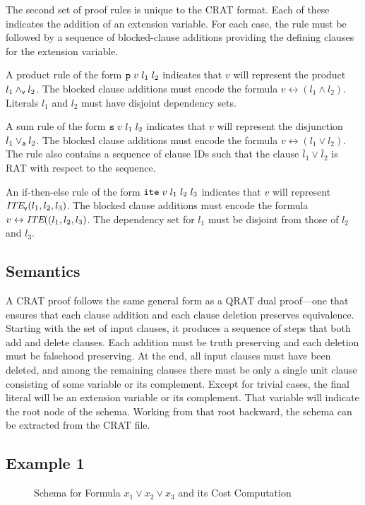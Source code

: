 \documentclass{llncs}
\newcommand{\pand}{\mathbin{\land_{\sf v}}}
\newcommand{\por}{\mathbin{\lor_{\sf a}}}
\newcommand{\obar}[1]{\overline{#1}}
\newcommand{\ite}{\mbox{\it ITE}}
\newcommand{\pite}{\mbox{\it ITE}_{\sf v}}
\begin{document}
The second set of proof rules is unique to the CRAT format.  Each of
these indicates the addition of an extension variable.  For each case,
the rule must be followed by a sequence of blocked-clause additions
providing the defining clauses for the extension variable.

A product rule of the form ${\tt p}\;v\;l_1\;l_2$ indicates that $v$
will represent the product $l_1 \pand l_2$.  The blocked clause
additions must encode the formula $v \leftrightarrow (l_1 \land l_2)$.
Literals $l_1$ and $l_2$ must have disjoint dependency sets.

A sum rule of the form ${\tt s}\;v\;l_1\;l_2$ indicates that $v$ will
represent the disjunction $l_1 \por l_2$.  The blocked clause
additions must encode the formula $v \leftrightarrow (l_1 \lor l_2)$.
The rule also contains a sequence of clause IDs such that the clause
$\obar{l}_1 \lor \obar{l}_2$ is RAT with respect to the sequence.

An if-then-else rule of the form ${\tt ite}\;v\;l_1\;l_2\;l_3$
indicates that $v$ will represent $\pite(l_1, l_2, l_3)$.  The blocked
clause additions must encode the formula
$v \leftrightarrow \ite((l_1,l_2, l_3)$.
The dependency set for $l_1$ must be disjoint from those
of $l_2$ and $l_3$.


\subsection{Semantics}

A CRAT proof follows the same general form as a QRAT dual proof---one
that ensures that each clause addition and each clause deletion preserves
equivalence.  Starting with the set of input clauses, it produces a
sequence of steps that both add and delete clauses.  Each addition
must be truth preserving and each deletion must be falsehood
preserving.  At the end, all input clauses must have been deleted, and
among the remaining clauses there must be only a single unit clause consisting of some variable or
its complement.  Except for trivial cases, the final literal will be
an extension variable or its complement.  That variable will indicate the root node of the schema.
Working from that root backward, the schema can be extracted from the CRAT file.

\subsection{Example 1}

\begin{figure}
\caption{Schema for Formula $x_1 \lor x_2 \lor x_3$ and its Cost Computation}
\label{fig:c3:schema}
\end{figure}
\end{document}
